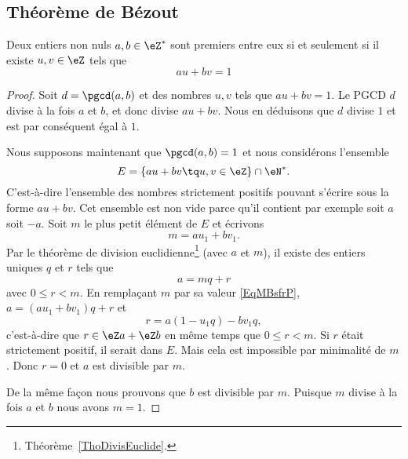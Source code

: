 \subsection{Théorème de Bézout}


\begin{theorem} \label{ThoBuNjam}
	Deux entiers non nuls \( a,b\in\eZ^*\) sont premiers entre eux si et seulement si il existe \( u,v\in\eZ\) tels que
	\begin{equation}
		au+bv=1
	\end{equation}
\end{theorem}

\begin{proof}
	Soit \( d=\pgcd(a,b)\) et des nombres \( u,v\) tels que \( au+bv=1\). Le PGCD \( d\) divise à la fois \( a\) et \( b\), et donc divise \( au+bv\). Nous en déduisons que \( d\) divise \( 1\) et est par conséquent égal à \( 1\).

	Nous supposons maintenant que \( \pgcd(a,b)=1\) et nous considérons l'ensemble
	\begin{equation}
		E=\{ au+bv\tq u,v\in \eZ \}\cap \eN^*.
	\end{equation}
	C'est-à-dire l'ensemble des nombres strictement positifs pouvant s'écrire sous la forme \( au+bv\). Cet ensemble est non vide parce qu'il contient par exemple soit \( a\) soit \( -a\). Soit \( m\) le plus petit élément de \( E\) et écrivons
	\begin{equation}    \label{EqMBsfrP}
		m=au_1+bv_1.
	\end{equation}
	Par le théorème de division euclidienne\footnote{Théorème~\ref{ThoDivisEuclide}.} (avec \( a\) et \( m\)), il existe des entiers uniques \( q\) et \( r\) tels que
	\begin{equation}
		a=mq+r
	\end{equation}
	avec \( 0\leq r<m\). En remplaçant \( m\) par sa valeur \eqref{EqMBsfrP}, \( a=(au_1+bv_1)q+r\) et
	\begin{equation}
		r=a(1-u_1q)-bv_1q,
	\end{equation}
	c'est-à-dire que \( r\in \eZ a+\eZ b\) en même temps que \( 0\leq r<m\). Si \( r\) était strictement positif, il serait dans \( E\). Mais cela est impossible par minimalité de \( m\). Donc \( r=0\) et \( a\) est divisible par \( m\).

	De la même façon nous prouvons que \( b\) est divisible par \( m\). Puisque \( m\) divise à la fois \( a\) et \( b\) nous avons \( m=1\).
\end{proof}

